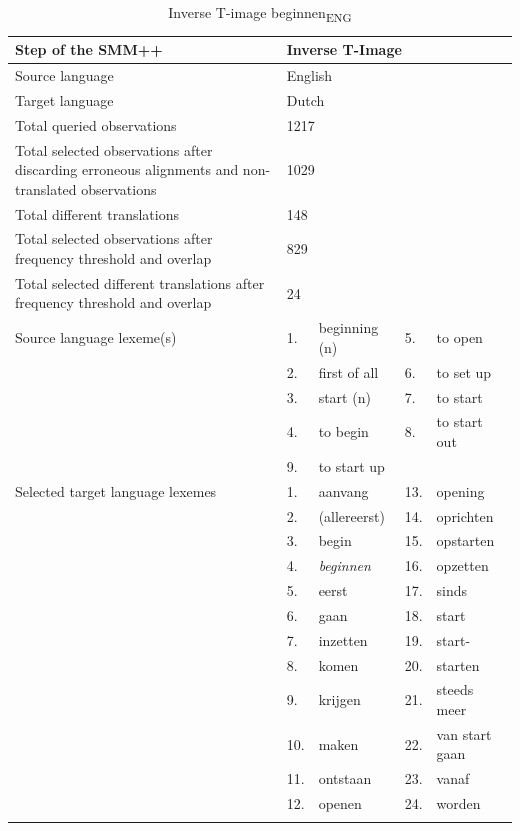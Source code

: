 \begin{table}
\caption{Inverse T-image beginnen\textsubscript{ENG}\label{tab:3:8}}
\small
\begin{tabularx}{\textwidth}{p{}lXlX}
\lsptoprule
Step of the SMM++ & \multicolumn{4}{l}{Inverse T-Image}\\ \midrule
\rowcolor{lsLightGray} Source language & \multicolumn{4}{l}{ English}\\
Target language & \multicolumn{4}{l}{ Dutch}\\
\rowcolor{lsLightGray} Total queried observations & \multicolumn{4}{l}{ 1217}\\
Total selected observations after discarding erroneous alignments and non-translated observations & \multicolumn{4}{l}{ 1029}\\
\rowcolor{lsLightGray} Total different translations & \multicolumn{4}{l}{ 148}\\
Total selected observations after frequency threshold and overlap & \multicolumn{4}{l}{ 829}\\
\rowcolor{lsLightGray} Total selected different translations after frequency threshold and overlap & \multicolumn{4}{l}{ 24}\\
Source language lexeme(s) & 1. & beginning (n) & 5. & to open \\
& 2. & first of all & 6. & to set up \\
& 3. & start (n) & 7. & to start \\
& 4. & to begin & 8. & to start out \\
& 9. & to start up & & \\
\rowcolor{lsLightGray}Selected target language lexemes & 1. &  aanvang & 13.& opening\\
\rowcolor{lsLightGray}& 2. & (allereerst) & 14.& oprichten\\
\rowcolor{lsLightGray}& 3. & begin & 15.& opstarten\\
\rowcolor{lsLightGray}& 4. & \textit{beginnen} & 16.& opzetten\\
\rowcolor{lsLightGray}& 5. & eerst & 17.& sinds\\
\rowcolor{lsLightGray}& 6. & gaan & 18.& start\\
\rowcolor{lsLightGray}& 7. & inzetten & 19.& start-\\
\rowcolor{lsLightGray}& 8. & komen & 20.& starten\\
\rowcolor{lsLightGray}& 9. & krijgen & 21.& steeds meer\\
\rowcolor{lsLightGray}& 10.& maken & 22.& van start gaan\\
\rowcolor{lsLightGray}& 11.& ontstaan & 23.& vanaf\\
\rowcolor{lsLightGray}& 12.& openen & 24.& worden\\
\lspbottomrule
\end{tabularx}
\end{table}

